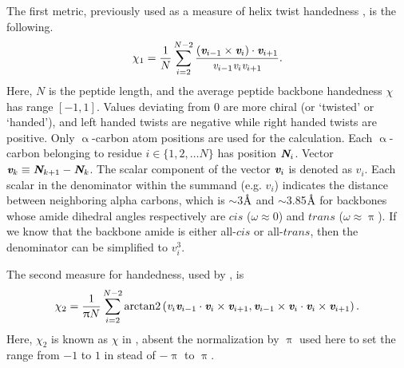 \documentclass[fleqn,10pt]{wlpeerj} %
\newcommand{\ang}{$\textrm\AA$\xspace}
\begin{document}
The first metric, previously used as a measure of helix twist handedness \citep{Kwiecinska2005}, is the following.
\begin{equation} \label{eqn:chi1}
\chi_1 = \frac{1}{N}\sum_{i = 2}^{N-2} \frac{(\textit{\textbf{v}}_{i-1} \times \textit{\textbf{v}}_{i})\cdot \textit{\textbf{v}}_{i+1}}{\textit{v}_{i-1} \textit{v}_{i} \textit{v}_{i+1}}.
\end{equation}
Here, $N$ is the peptide length, and the average peptide backbone handedness $\chi$ has range $[-1,1]$. Values deviating from 0 are more chiral (or `twisted' or `handed'), and left handed twists are negative while right handed twists are positive. Only $\upalpha$-carbon atom positions are used for the calculation. Each $\upalpha$-carbon belonging to residue $i \in \{ 1,2,\ldots N \}$ has position $\textit{\textbf{N}}_i$. %
Vector $\textit{\textbf{v}}_{k} \equiv \textit{\textbf{N}}_{k+1} - \textit{\textbf{N}}_{k}$. 
The scalar component of the vector $\textit{\textbf{v}}_i$ is denoted as $\textit{v}_i$. Each scalar in the denominator within the summand (e.g. $\textit{v}_i$) indicates the distance between neighboring alpha carbons, which is $\sim$3\ang and $\sim$3.85\ang for backbones whose amide dihedral angles respectively are $cis$ ($\omega\approx0$) and $trans$ ($\omega\approx\uppi$). If we know that the backbone amide is either all-$cis$ or all-$trans$, then the denominator can be simplified to $\textit{v}_i^3$.

The second measure for handedness, used by \cite{Gruziel2013}, is
\begin{equation}\label{eqn:chi2}
\displaystyle \chi_2 = \frac{1}{\uppi N}\sum_{i = 2}^{N-2}
 \textrm{arctan2}\left (\textit{v}_i \textit{\textbf{v}}_{i-1} \cdot \textit{\textbf{v}}_i \times \textit{\textbf{v}}_{i+1},\textit{\textbf{v}}_{i-1}\times \textit{\textbf{v}}_i \cdot \textit{\textbf{v}}_i\times \textit{\textbf{v}}_{i+1} \right ).
\end{equation}
Here, $\chi_2$ is known as $\chi$ in \cite{Gruziel2013}, absent the normalization by $\uppi$ used here to set the range from $-1$ to $1$ in stead of $-\uppi$ to $\uppi$. %
\end{document}
